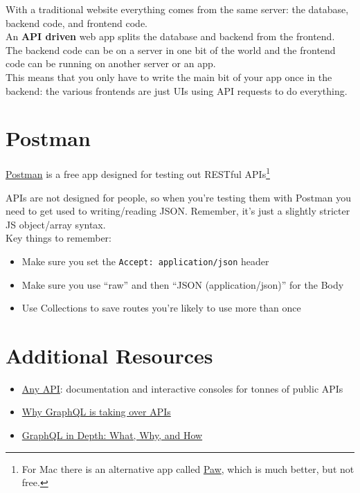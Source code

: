 With a traditional website everything comes from the same server: the database, backend code, and frontend code.
\\

An \textbf{API driven} web app splits the database and backend from the frontend. The backend code can be on a server in one bit of the world and the frontend code can be running on another server or an app.
\\

This means that you only have to write the main bit of your app once in the backend: the various frontends are just UIs using API requests to do everything.
\\



\pagebreak

\section{Postman}

\href{https://www.getpostman.com}{Postman} is a free app designed for testing out RESTful APIs\footnote{For Mac there is an alternative app called \href{https://paw.cloud}{Paw}, which is much better, but not free.}


APIs are not designed for people, so when you're testing them with Postman you need to get used to writing/reading JSON. Remember, it's just a slightly stricter JS object/array syntax.
\\

Key things to remember:

\begin{itemize}
    \item Make sure you set the \texttt{Accept: application/json} header
    \item Make sure you use ``raw'' and then ``JSON (application/json)'' for the Body
    \item Use Collections to save routes you're likely to use more than once
\end{itemize}



\section{Additional Resources}

\begin{itemize}[leftmargin=*]
    \item \href{https://any-api.com}{Any API}: documentation and interactive consoles for tonnes of public APIs
    \item \href{https://webapplog.com/graphql/}{Why GraphQL is taking over APIs}
    \item \href{https://ponyfoo.com/articles/graphql-in-depth-what-why-and-how}{GraphQL in Depth: What, Why, and How}
\end{itemize}
